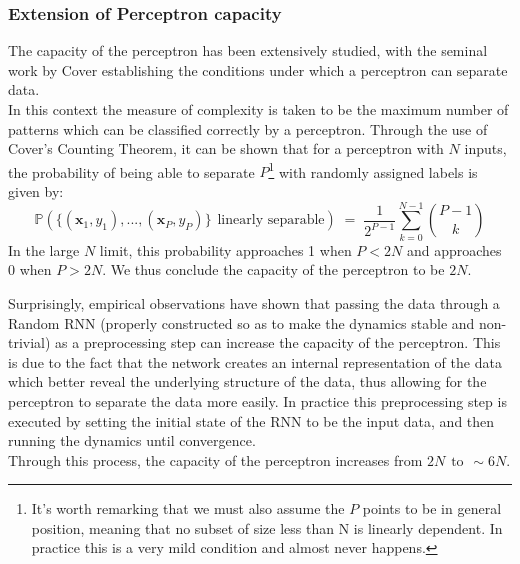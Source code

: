 \documentclass[a4paper,12pt]{report}
\begin{document}
\subsubsection*{Extension of Perceptron capacity}
The capacity of the perceptron has been extensively studied, with the seminal work by 
Cover \cite{Cover1965} establishing the conditions under which a perceptron can 
separate data.\\
In this context the measure of complexity is taken to be the maximum number of 
patterns which can be classified correctly by a perceptron. Through the use of 
Cover's Counting Theorem, it can be shown that for a perceptron with $N$ inputs, the 
probability of being able to separate $P$\footnote{
    \vspace{-0.15em}It's worth remarking that we must also assume the $P$ points to be in general position, meaning that
no subset of size less than N is linearly dependent. In practice this is a very mild condition and 
almost never happens.\vspace{-0.25em}
} with randomly assigned labels is given by:
\begin{equation}
  \mathbb{P}\left(\{ \left(\mathbf{x}_1, y_1 \right), \text{...}, 
  \left(\mathbf{x}_P, y_P \right)\} \hspace{5pt} \text{linearly separable}\right) \;=\; 
  \frac{1}{2^{P-1}} \sum_{k=0}^{N-1} \binom{P-1}{k}
\end{equation}
In the large $N$ limit, this probability approaches 1 when $P < 2N$ and approaches 0 when 
$P > 2N$. We thus conclude the capacity of the perceptron to be $2N$.
\vspace{0.5em}

Surprisingly, empirical observations \cite{Student2024} have shown that passing the data through a 
Random RNN (properly constructed so as to make the dynamics stable and non-trivial) as a 
preprocessing step can increase the capacity of the perceptron. This is due to the fact that the 
network creates an internal representation of the data which better reveal the underlying structure 
of the data, thus allowing for the perceptron to separate the data more easily. In practice this 
preprocessing step is executed by setting the initial state of the RNN to be the input data, and 
then running the dynamics until convergence. \\
Through this process, the capacity of the perceptron increases from $2N \hspace{5pt} \text{to} 
\hspace{5pt} \sim 6N$.
\end{document}
